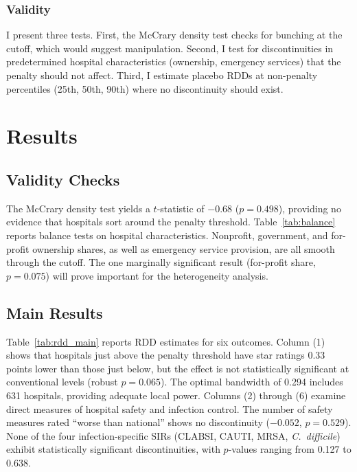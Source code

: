 \documentclass[12pt]{article}
\begin{document}
\subsubsection*{Validity} I present three tests. First, the McCrary density test \citep{cattaneo2020density} checks for bunching at the cutoff, which would suggest manipulation. Second, I test for discontinuities in predetermined hospital characteristics (ownership, emergency services) that the penalty should not affect. Third, I estimate placebo RDDs at non-penalty percentiles (25th, 50th, 90th) where no discontinuity should exist.


\section{Results}\label{sec:results}

\subsection{Validity Checks}

The McCrary density test yields a $t$-statistic of $-0.68$ ($p = 0.498$), providing no evidence that hospitals sort around the penalty threshold. Table~\ref{tab:balance} reports balance tests on hospital characteristics. Nonprofit, government, and for-profit ownership shares, as well as emergency service provision, are all smooth through the cutoff. The one marginally significant result (for-profit share, $p = 0.075$) will prove important for the heterogeneity analysis.



\subsection{Main Results}

Table~\ref{tab:rdd_main} reports RDD estimates for six outcomes. Column (1) shows that hospitals just above the penalty threshold have star ratings 0.33 points lower than those just below, but the effect is not statistically significant at conventional levels (robust $p = 0.065$). The optimal bandwidth of 0.294 includes 631 hospitals, providing adequate local power. Columns (2) through (6) examine direct measures of hospital safety and infection control. The number of safety measures rated ``worse than national'' shows no discontinuity ($-0.052$, $p = 0.529$). None of the four infection-specific SIRs (CLABSI, CAUTI, MRSA, \textit{C.\ difficile}) exhibit statistically significant discontinuities, with $p$-values ranging from 0.127 to 0.638.
\end{document}
